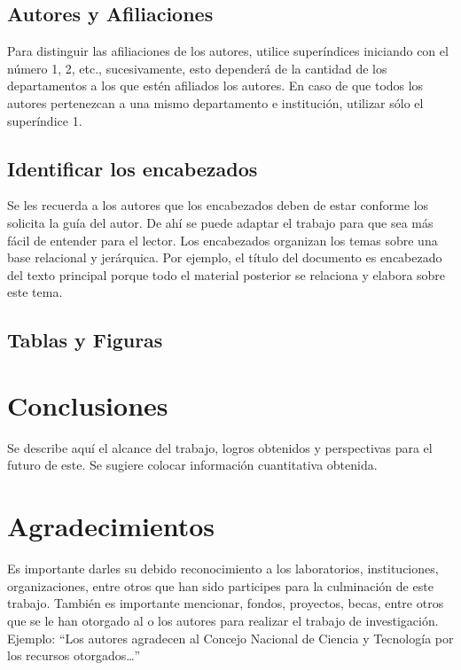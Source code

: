     \subsection{Autores y Afiliaciones}

    Para distinguir las afiliaciones de los autores, utilice superíndices iniciando con el número 1, 2, etc., sucesivamente, esto dependerá de la cantidad de los departamentos a los que estén afiliados los autores. En caso de que todos los autores pertenezcan a una mismo departamento e institución, utilizar sólo el superíndice 1. 

    \subsection{Identificar los encabezados}

    Se les recuerda a los autores que los encabezados deben de estar conforme los solicita la guía del autor. De ahí se puede adaptar el trabajo para que sea más fácil de entender para el lector.
    Los encabezados organizan los temas sobre una base relacional y jerárquica. Por ejemplo, el título del documento es encabezado del texto principal porque todo el material posterior se relaciona y elabora sobre este tema. 

    \subsection{Tablas y Figuras}

   

    \section{Conclusiones}

    Se describe aquí el alcance del trabajo, logros obtenidos y perspectivas para el futuro de este. Se sugiere colocar información cuantitativa obtenida.

    \section{Agradecimientos}

    Es importante darles su debido reconocimiento a los laboratorios, instituciones, organizaciones, entre otros que han sido participes para la culminación de este trabajo. También es importante mencionar, fondos, proyectos, becas, entre otros que se le han otorgado al o los autores para realizar el trabajo de investigación. Ejemplo: “Los autores agradecen al Concejo Nacional de Ciencia y Tecnología por los recursos otorgados…”

